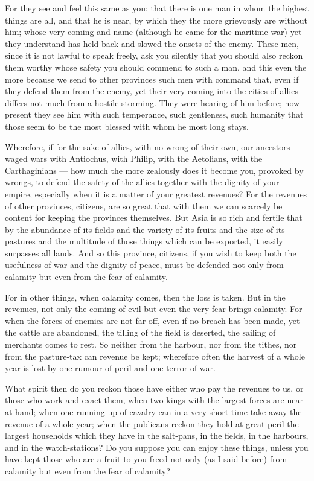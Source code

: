  For they see and feel this same as you: that there is one man in whom the highest things are all, and that he is near, by which they the more grievously are without him; whose very coming and name (although he came for the maritime war) yet they understand has held back and slowed the onsets of the enemy. These men, since it is not lawful to speak freely, ask you silently that you should also reckon them worthy whose safety you should commend to such a man, and this even the more because we send to other provinces such men with command that, even if they defend them from the enemy, yet their very coming into the cities of allies differs not much from a hostile storming. They were hearing of him before; now present they see him with such temperance, such gentleness, such humanity that those seem to be the most blessed with whom he most long stays.

 Wherefore, if for the sake of allies, with no wrong of their own, our ancestors waged wars with Antiochus, with Philip, with the Aetolians, with the Carthaginians --- how much the more zealously does it become you, provoked by wrongs, to defend the safety of the allies together with the dignity of your empire, especially when it is a matter of your greatest revenues? For the revenues of other provinces, citizens, are so great that with them we can scarcely be content for keeping the provinces themselves. But Asia is so rich and fertile that by the abundance of its fields and the variety of its fruits and the size of its pastures and the multitude of those things which can be exported, it easily surpasses all lands. And so this province, citizens, if you wish to keep both the usefulness of war and the dignity of peace, must be defended not only from calamity but even from the fear of calamity.

 For in other things, when calamity comes, then the loss is taken. But in the revenues, not only the coming of evil but even the very fear brings calamity. For when the forces of enemies are not far off, even if no breach has been made, yet the cattle are abandoned, the tilling of the field is deserted, the sailing of merchants comes to rest. So neither from the harbour, nor from the tithes, nor from the pasture-tax can revenue be kept; wherefore often the harvest of a whole year is lost by one rumour of peril and one terror of war.

 What spirit then do you reckon those have either who pay the revenues to us, or those who work and exact them, when two kings with the largest forces are near at hand; when one running up of cavalry can in a very short time take away the revenue of a whole year; when the publicans reckon they hold at great peril the largest households which they have in the salt-pans, in the fields, in the harbours, and in the watch-stations? Do you suppose you can enjoy these things, unless you have kept those who are a fruit to you freed not only (as I said before) from calamity but even from the fear of calamity?


